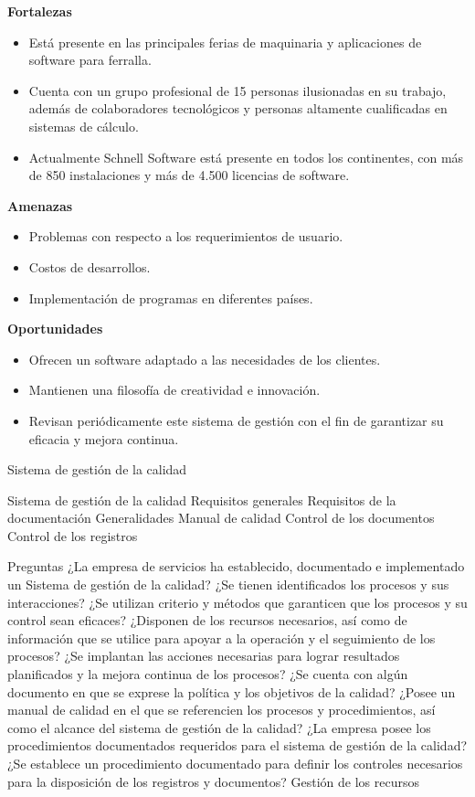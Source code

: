 \documentclass[10pt,a4paper]{article}
\begin{document}
\begin{enumerate}
\textbf{Fortalezas}

\begin{itemize}
\item Está presente en las principales ferias de maquinaria y aplicaciones de software para ferralla.
\item Cuenta con un grupo profesional de 15 personas ilusionadas en su trabajo, además de colaboradores tecnológicos y personas altamente cualificadas en sistemas de cálculo.
\item Actualmente Schnell Software está presente en todos los continentes, con más de 850 instalaciones y más de 4.500 licencias de software.
\end{itemize}

\textbf{Amenazas}

\begin{itemize}
\item Problemas con respecto a los requerimientos de usuario.
\item Costos de desarrollos.
\item Implementación de programas en diferentes países.
\end{itemize}

\textbf{Oportunidades}

\begin{itemize}
\item Ofrecen un software adaptado a las necesidades de los clientes.
\item Mantienen una filosofía de creatividad e innovación. 
\item Revisan periódicamente este sistema de gestión con el fin de garantizar su eficacia y mejora continua.
\end{itemize}


Sistema de gestión de la calidad

Sistema de gestión de la calidad
Requisitos generales
Requisitos de la documentación
Generalidades
Manual de calidad
Control de los documentos
Control de los registros

Preguntas
¿La empresa de servicios ha establecido, documentado e implementado un Sistema de gestión de la calidad? 
¿Se tienen identificados los procesos y sus interacciones?
¿Se utilizan criterio y métodos que garanticen que los procesos y su control sean eficaces?
¿Disponen de los recursos necesarios, así como de información que se utilice para apoyar a la operación y el seguimiento de los procesos?
¿Se implantan las acciones necesarias para lograr resultados planificados y la mejora continua de los procesos? 
¿Se cuenta con algún documento en que se exprese la política y los objetivos de la calidad?
¿Posee un manual de calidad en el que se referencien los procesos y procedimientos, así como el alcance del sistema de gestión de la calidad?
¿La empresa posee los procedimientos documentados requeridos para el sistema de gestión de la calidad?
¿Se establece un procedimiento documentado para definir los controles necesarios para la disposición de los registros y documentos? 
Gestión de los recursos


\end{enumerate}
\end{document}
